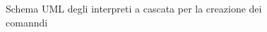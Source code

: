 \begin{figure}[H]
    \centering
    \caption{Schema UML degli interpreti a cascata per la creazione dei comanndi}
    \label{img:ArchitectureDiagram-Pagina-5}
\end{figure}
